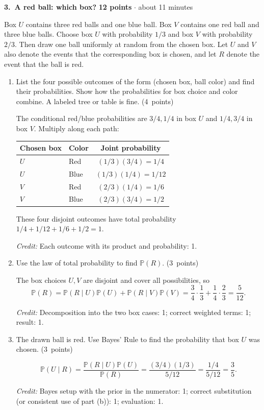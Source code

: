 \documentclass[11pt,letterpaper]{article}
\newcommand{\Prob}{\mathbb P}
\newcommand{\partpts}[1]{\unskip\nobreak\hspace{.3em}%
  \mbox{\small\color{muted}(#1 points)}}
\newcommand{\credit}[1]{\par{\footnotesize\color{muted}\textit{Credit:} #1}}
\newcommand{\problem}[4]{\par\addvspace{8pt}%
  {\large\bfseries\color{indigo}#1.\ #2}\hfill
  {\small\color{muted}\textbf{#3 points} $\cdot$ about #4 minutes}\par\nobreak}
\begin{document}
\newpage
\problem{3}{A red ball: which box?}{12}{11}
Box $U$ contains three red balls and one blue ball. Box $V$ contains one red
ball and three blue balls. Choose box $U$ with probability $1/3$ and box $V$
with probability $2/3$. Then draw one ball uniformly at random from the chosen
box. Let $U$ and $V$ also denote the events that the corresponding box is
chosen, and let $R$ denote the event that the ball is red.
\begin{enumerate}
  \item List the four possible outcomes of the form (chosen box, ball color)
  and find their probabilities. Show how the probabilities for box choice and
  color combine. A labeled tree or table is fine. \partpts{4}
  \begin{solution}[2in]
    The conditional red/blue probabilities are $3/4,1/4$ in box $U$ and
    $1/4,3/4$ in box $V$. Multiply along each path:
    \begin{center}
    \begin{tabular}{@{}llc@{}}
    \toprule
    Chosen box & Color & Joint probability\\
    \midrule
    $U$ & Red  & $(1/3)(3/4)=1/4$\\[3pt]
    $U$ & Blue & $(1/3)(1/4)=1/12$\\[3pt]
    $V$ & Red  & $(2/3)(1/4)=1/6$\\[3pt]
    $V$ & Blue & $(2/3)(3/4)=1/2$\\
    \bottomrule
    \end{tabular}
    \end{center}
    These four disjoint outcomes have total probability
    $1/4+1/12+1/6+1/2=1$.
    \credit{Each outcome with its product and probability: 1.}
  \end{solution}

  \item Use the law of total probability to find $\Prob(R)$. \partpts{3}
  \begin{solution}[1.2in]
    The box choices $U,V$ are disjoint and cover all possibilities, so
    \[
      \Prob(R)=\Prob(R\mid U)\Prob(U)+\Prob(R\mid V)\Prob(V)
      =\frac34\cdot\frac13+\frac14\cdot\frac23=\frac5{12}.
    \]
    \credit{Decomposition into the two box cases: 1; correct weighted
    terms: 1; result: 1.}
  \end{solution}

  \item The drawn ball is red. Use Bayes' Rule to find the probability
  that box $U$ was chosen. \partpts{3}
  \begin{solution}[1.35in]
    \[
      \Prob(U\mid R)
      =\frac{\Prob(R\mid U)\Prob(U)}{\Prob(R)}
      =\frac{(3/4)(1/3)}{5/12}
      =\frac{1/4}{5/12}=\frac35.
    \]
    \credit{Bayes setup with the prior in the numerator: 1; correct
    substitution (or consistent use of part (b)): 1; evaluation: 1.}
  \end{solution}


\end{enumerate}
\end{document}
